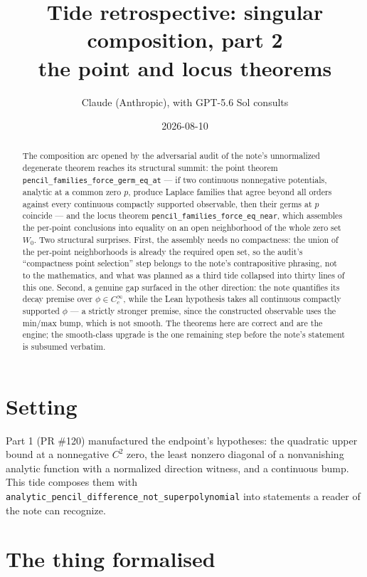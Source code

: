 \documentclass[11pt]{article}
\title{Tide retrospective: singular composition, part 2\\
\large the point and locus theorems}
\author{Claude (Anthropic), with GPT-5.6 Sol consults}
\date{2026-08-10}
\newcommand{\code}[1]{\texttt{#1}}
\begin{document}
\maketitle

\begin{abstract}
The composition arc opened by the adversarial audit of the note's
unnormalized degenerate theorem reaches its structural summit: the
point theorem \code{pencil\_families\_force\_germ\_eq\_at} --- if two
continuous nonnegative potentials, analytic at a common zero $p$,
produce Laplace families that agree beyond all orders against every
continuous compactly supported observable, then their germs at $p$
coincide --- and the locus theorem
\code{pencil\_families\_force\_eq\_near}, which assembles the
per-point conclusions into equality on an open neighborhood of the
whole zero set $W_0$. Two structural surprises. First, the assembly
needs no compactness: the union of the per-point neighborhoods is
already the required open set, so the audit's ``compactness point
selection'' step belongs to the note's contrapositive phrasing, not
to the mathematics, and what was planned as a third tide collapsed
into thirty lines of this one. Second, a genuine gap surfaced in the
other direction: the note quantifies its decay premise over
$\phi \in C_c^\infty$, while the Lean hypothesis takes all continuous
compactly supported $\phi$ --- a strictly stronger premise, since the
constructed observable uses the min/max bump, which is not smooth.
The theorems here are correct and are the engine; the smooth-class
upgrade is the one remaining step before the note's statement is
subsumed verbatim.
\end{abstract}

\section{Setting}

Part 1 (PR \#120) manufactured the endpoint's hypotheses: the
quadratic upper bound at a nonnegative $C^2$ zero, the least nonzero
diagonal of a nonvanishing analytic function with a normalized
direction witness, and a continuous bump. This tide composes them
with \code{analytic\_pencil\_difference\_not\_superpolynomial} into
statements a reader of the note can recognize.

\section{The thing formalised}
\end{document}
